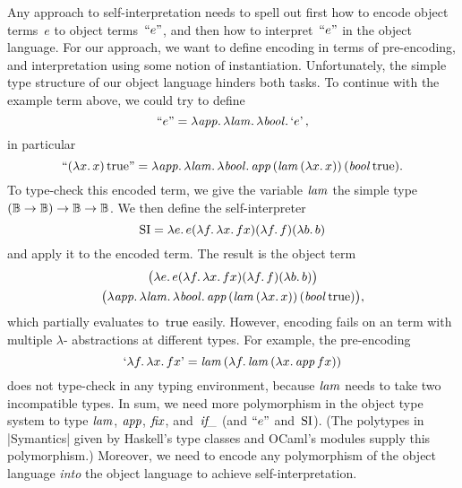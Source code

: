 Any approach to self\hyp interpretation needs to spell out first how to
encode object terms~$e$ to object terms~$\Encode{e}$, and then how to
interpret~$\Encode{e}$ in the object language.  For our approach, we
want to define encoding in terms of pre-encoding, and interpretation
using some notion of instantiation.  Unfortunately, the simple type
structure of our object language hinders both tasks.  To continue with
the example term above, we could try to define
\begin{equation*}
    \Encode{e} =
    \fun{\ident{app}} \fun{\ident{lam}} \fun{\ident{bool}} \encode{e},
\end{equation*}
in particular
\begin{equation*}
    \Encode{(\fun{x}x)\True} =
    \fun{\ident{app}} \fun{\ident{lam}} \fun{\ident{bool}}
    \ident{app} (\ident{lam} (\fun{x} x))\, (\ident{bool} \True).
\end{equation*}
To type-check this encoded term, we give the variable $\ident{lam}$ the
simple type $(\BB\to\BB)\to\BB\to\BB$.
We then define the self\hyp interpreter
\begin{equation*}
    \si = \fun{e} e
    (\fun{f} \fun{x} fx)
    (\fun{f} f)
    (\fun{b} b)
\end{equation*}
and apply it to the encoded term.  The result is the object term
\begin{multline*}
    \bigl(\fun{e} e (\fun{f} \fun{x} fx) (\fun{f} f) (\fun{b} b)\bigr)
\\
    \bigl(
    \fun{\ident{app}} \fun{\ident{lam}} \fun{\ident{bool}}
    \ident{app} (\ident{lam} (\fun{x} x))\, (\ident{bool} \True)
    \bigr),
\end{multline*}
which partially evaluates to~$\True$ easily.
However, encoding fails on an term with multiple $\lambda$\hyp
abstractions at different types.  For example, the pre-encoding
\begin{equation*}
    \encode{\fun{f}\fun{x}fx}
    = \ident{lam} (\fun{f} \ident{lam} (\fun{x} \ident{app} f x))
\end{equation*}
does not type-check in any typing environment, because $\ident{lam}$ needs
to take two incompatible types.  In sum, we need more polymorphism in the
object type system to type $\ident{lam}$, $\ident{app}$, $\ident{fix}$,
and~$\ident{if\_}$ (and $\Encode{e}$ and~$\si$).
(The polytypes in |Symantics| given by Haskell's type classes and OCaml's
modules supply this polymorphism.)  Moreover, we need to encode any
polymorphism of the object language \emph{into} the object language to achieve
self\hyp interpretation.

